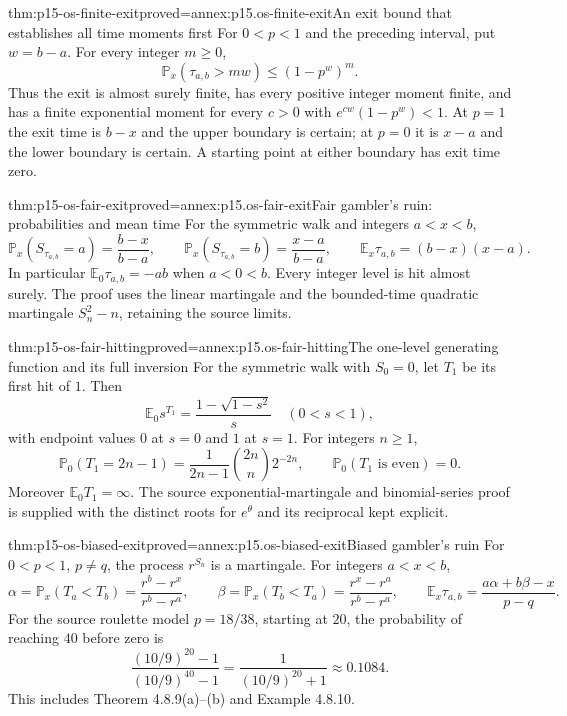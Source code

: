 \begin{hblemma}{thm:p15-os-finite-exit}{proved=annex:p15.os-finite-exit}{An exit bound that establishes all time moments first}
For \(0<p<1\) and the preceding interval, put \(w=b-a\).
For every integer \(m\geq0\),
\[
 \mathbb P_x(\tau_{a,b}>mw)\leq(1-p^w)^m.
 \]
Thus the exit is almost surely finite, has every positive
integer moment finite, and has a finite exponential moment
for every \(c>0\) with \(e^{cw}(1-p^w)<1\).
At \(p=1\) the exit time is \(b-x\) and the upper boundary
is certain; at \(p=0\) it is \(x-a\) and the lower boundary
is certain. A starting point at either boundary has exit time zero.
\end{hblemma}

\begin{hbtheorem}{thm:p15-os-fair-exit}{proved=annex:p15.os-fair-exit}{Fair gambler's ruin: probabilities and mean time}
For the symmetric walk and integers \(a<x<b\),
\[
 \mathbb P_x(S_{\tau_{a,b}}=a)=\frac{b-x}{b-a},\qquad
 \mathbb P_x(S_{\tau_{a,b}}=b)=\frac{x-a}{b-a},\qquad
 \mathbb E_x\tau_{a,b}=(b-x)(x-a).
 \]
In particular \(\mathbb E_0\tau_{a,b}=-ab\) when \(a<0<b\).
Every integer level is hit almost surely.
The proof uses the linear martingale and the bounded-time
quadratic martingale \(S_n^2-n\), retaining the source limits.
\end{hbtheorem}

\begin{hbtheorem}{thm:p15-os-fair-hitting}{proved=annex:p15.os-fair-hitting}{The one-level generating function and its full inversion}
For the symmetric walk with \(S_0=0\), let \(T_1\) be its
first hit of \(1\). Then
\[
 \mathbb E_0s^{T_1}=\frac{1-\sqrt{1-s^2}}s\quad(0<s<1),
 \]
with endpoint values \(0\) at \(s=0\) and \(1\) at \(s=1\).
For integers \(n\geq1\),
\[
 \mathbb P_0(T_1=2n-1)
   =\frac1{2n-1}\binom{2n}{n}2^{-2n},
 \qquad \mathbb P_0(T_1\text{ is even})=0.
 \]
Moreover \(\mathbb E_0T_1=\infty\).
The source exponential-martingale and binomial-series proof
is supplied with the distinct roots for \(e^\theta\) and
its reciprocal kept explicit.
\end{hbtheorem}

\begin{hbtheorem}{thm:p15-os-biased-exit}{proved=annex:p15.os-biased-exit}{Biased gambler's ruin}
For \(0<p<1\), \(p\ne q\), the process \(r^{S_n}\) is a
martingale. For integers \(a<x<b\),
\[
 \alpha=\mathbb P_x(T_a<T_b)=\frac{r^b-r^x}{r^b-r^a},
 \qquad
 \beta=\mathbb P_x(T_b<T_a)=\frac{r^x-r^a}{r^b-r^a},
 \qquad
 \mathbb E_x\tau_{a,b}=\frac{a\alpha+b\beta-x}{p-q}.
 \]
For the source roulette model \(p=18/38\), starting at \(20\),
the probability of reaching \(40\) before zero is
\[
 \frac{(10/9)^{20}-1}{(10/9)^{40}-1}
       =\frac1{(10/9)^{20}+1}\approx0.1084.
 \]
This includes Theorem 4.8.9(a)--(b) and Example 4.8.10.
\end{hbtheorem}

